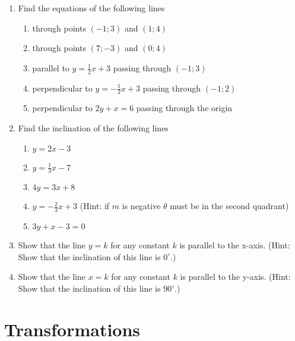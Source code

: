{
\begin{enumerate}
\item Find the equations of the following lines
\begin{enumerate}
\item through points $(-1;3)$ and $(1;4)$
\item through points $(7;-3)$ and $(0;4)$
\item parallel to $y = \frac{1}{2}x + 3$ passing through $(-1;3)$
\item perpendicular to $y = -\frac{1}{2}x + 3$ passing through $(-1;2)$
\item perpendicular to $2y + x = 6$ passing through the origin
\end{enumerate}

\item Find the inclination of the following lines
\begin{enumerate}
\item $y = 2x -3$
\item $y = \frac{1}{3}x - 7$
\item $4y = 3x + 8$
\item $y = -\frac{2}{3}x + 3$  (Hint: if $m$ is negative $\theta$ must be in the second quadrant)
\item $3y + x - 3 = 0$
\end{enumerate}

\item{Show that the line $y=k$ for any constant $k$ is parallel to the x-axis. (Hint: Show that the inclination of this line is $0^{\circ}$.)}
\item{Show that the line $x=k$ for any constant $k$ is parallel to the y-axis. (Hint: Show that the inclination of this line is $90^{\circ}$.)}
\end{enumerate}
}

\section{Transformations}
\label{mg:t}

